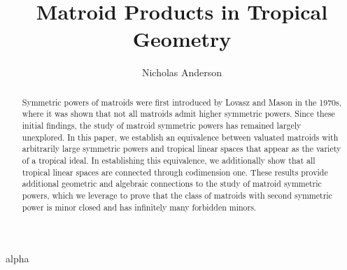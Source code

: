 \documentclass[12pt, a4paper, reqno]{amsart}
\numberwithin{equation}{section}
\begin{document}
\title{Matroid Products in Tropical Geometry}

\author{Nicholas Anderson}
\address{School of Mathematical Sciences, Queen Mary University of London, Mile End Road, London E1 4NS, United Kingdom}



\begin{abstract}
Symmetric powers of matroids were first introduced by Lovasz \cite{Lovasz77} and Mason \cite{MGlueing} in the 1970s, where it was shown that not all matroids admit higher symmetric powers. Since these initial findings, the study of matroid symmetric powers has remained largely unexplored. In this paper, we establish an equivalence between valuated matroids with arbitrarily large symmetric powers and tropical linear spaces that appear as the variety of a tropical ideal. In establishing this equivalence, we additionally show that all tropical linear spaces are connected through codimension one. These results provide additional geometric and algebraic connections to the study of matroid symmetric powers, which we leverage to prove that the class of matroids with second symmetric power is minor closed and has infinitely many forbidden minors.

\end{abstract}

\maketitle








 {alpha}

\end{document}
